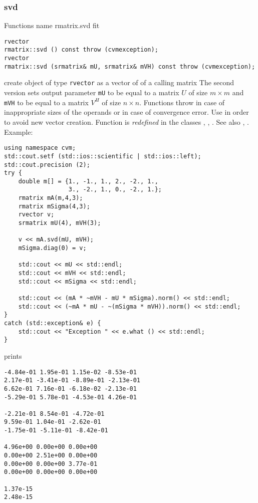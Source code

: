 \subsubsection{svd}
Functions%
\pdfdest name {rmatrix.svd} fit
\begin{verbatim}
rvector
rmatrix::svd () const throw (cvmexception);
rvector
rmatrix::svd (srmatrix& mU, srmatrix& mVH) const throw (cvmexception);
\end{verbatim}
create  object of type \verb"rvector"
as a vector of
 of a calling matrix
The second version 
sets output parameter \verb"mU" to be equal
to a matrix $U$ of size $m\times m$ and
\verb"mVH" to be equal
to a matrix $V^H$ of size $n\times n$.
Functions throw
in case of inappropriate sizes of the operands
or in case of convergence error.
Use  in order to avoid new vector creation.
Function is \emph{redefined} in the classes , ,
.
See also
,
.
Example:
\begin{Verbatim}
using namespace cvm;
std::cout.setf (std::ios::scientific | std::ios::left);
std::cout.precision (2);
try {
    double m[] = {1., -1., 1., 2., -2., 1.,
                  3., -2., 1., 0., -2., 1.};
    rmatrix mA(m,4,3);
    rmatrix mSigma(4,3);
    rvector v;
    srmatrix mU(4), mVH(3);

    v << mA.svd(mU, mVH);
    mSigma.diag(0) = v;

    std::cout << mU << std::endl;
    std::cout << mVH << std::endl;
    std::cout << mSigma << std::endl;

    std::cout << (mA * ~mVH - mU * mSigma).norm() << std::endl;
    std::cout << (~mA * mU - ~(mSigma * mVH)).norm() << std::endl;
}
catch (std::exception& e) {
    std::cout << "Exception " << e.what () << std::endl;
}
\end{Verbatim}
prints
\begin{Verbatim}
-4.84e-01 1.95e-01 1.15e-02 -8.53e-01
2.17e-01 -3.41e-01 -8.89e-01 -2.13e-01
6.62e-01 7.16e-01 -6.18e-02 -2.13e-01
-5.29e-01 5.78e-01 -4.53e-01 4.26e-01

-2.21e-01 8.54e-01 -4.72e-01
9.59e-01 1.04e-01 -2.62e-01
-1.75e-01 -5.11e-01 -8.42e-01

4.96e+00 0.00e+00 0.00e+00
0.00e+00 2.51e+00 0.00e+00
0.00e+00 0.00e+00 3.77e-01
0.00e+00 0.00e+00 0.00e+00

1.37e-15
2.48e-15
\end{Verbatim}
\newpage



